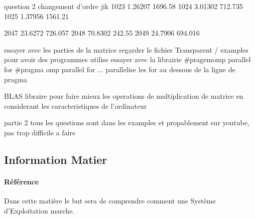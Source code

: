 \documentclass{article}
\begin{document}
question 2
    changement d'ordre jik
        1023 1.26207 1696.58
        1024 3.01302 712.735
        1025 1.37956 1561.21

        2047 23.6272 726.057
        2048 70.8302 242.55
        2049 24.7906 694.016
    
essayer avec les parties de la matrice
regarder le fichier Transparent / examples pour avoir des programmes utilise
essayer avec la librairie #pragemomp parallel for
#pragma omp parallel for ... parallelise les for au dessous de la ligne de pragma


BLAS libraire pour faire mieux les operations de multiplication de matrice en considerant les caracteristiques de l'ordinateur



partie 2
tous les questions sont dans les examples et propablement sur youtube, pas trop difficile a faire


\subsection{Information Matier}
\paragraph{Référence}Dans cette matière le but sera de comprendre comment une Système d'Exploitation marche.
\end{document}
